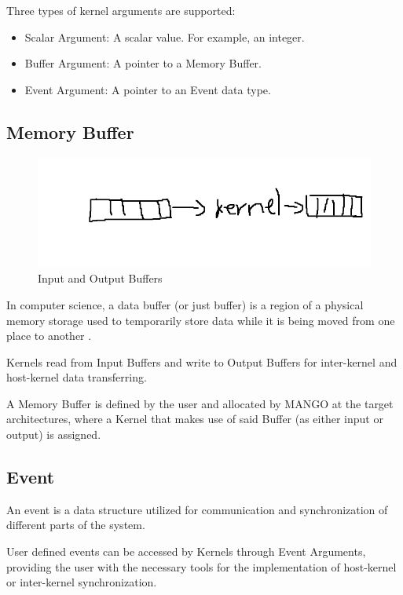 Three types of kernel arguments are supported: 
\begin{itemize}
    \item Scalar Argument: A scalar value. For example, an integer.
    \item Buffer Argument: A pointer to a Memory Buffer.
    \item Event Argument: A pointer to an Event data type.
\end{itemize}

\subsection{Memory Buffer}
\begin{figure}[ht]
    \centering
    \includegraphics[width=\textwidth]{img/kernel_buffer.png}
    \captionsetup{justification=centering}
    \caption{Input and Output Buffers}
    \label{fig:in_out_buffers}
\end{figure}

In computer science, a data buffer (or just buffer) is a region of a physical memory storage used to temporarily store data while it is being moved from one place to another \cite{buffer_wikipedia}.

Kernels read from Input Buffers and write to Output Buffers for inter-kernel and host-kernel data transferring.

A Memory Buffer is defined by the user and allocated by MANGO at the target architectures, where a Kernel that makes use of said Buffer (as either input or output) is assigned.

\subsection{Event}

An event is a data structure utilized for communication and synchronization of different parts of the system.

User defined events can be accessed by Kernels through Event Arguments, providing the user with the necessary tools for the implementation of host-kernel or inter-kernel synchronization.

